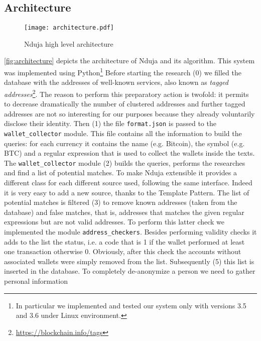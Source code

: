 \subsection{Architecture}


\begin{figure*}
	\centering
	\texttt{[image: architecture.pdf]}
	\caption{Nduja high level architecture}
	\label{fig:architecture}
\end{figure*}



\autoref{fig:architecture} depicts the architecture of Nduja and its algorithm.
This system was implemented using Python\footnote{
	In particular we implemented and tested our system only with versions
	3.5 and 3.6 under Linux environment.}
Before starting the research (0) we filled the database with the addresses of
well-known services, also known as
\emph{tagged addresses}\footnote{\url{https://blockchain.info/tags}}.
The reason to perform this preparatory action 
is twofold: it permits to decrease dramatically the number of
clustered addresses and further tagged addresses are not so
interesting for our purposes because they already voluntarily disclose their
identity.
Then (1) the file \texttt{format.json} is passed to the \verb|wallet_collector|
module. This file contains all the information to build the queries: for each
currency it contains the name (e.g. Bitcoin), the symbol (e.g. BTC) and a
regular expression that is used to collect the wallets inside the texts.
The \verb|wallet_collector| module (2) builds the queries, performs the
researches and find a list of potential matches. To make Nduja extensible it
provides a different class for each different source used, following the same
interface. Indeed it is very easy to add a new source, thanks to the Template
Pattern.
The list of potential matches is filtered (3) to remove known addresses (taken
from the database) and false matches, that is, addresses that matches the given
regular expressions but are not valid addresses. To perform this latter check
we implemented the module \verb|address_checkers|.
Besides performing validity checks it adds to the list the status, i.e. a
code that is 1 if the wallet performed at least one transaction otherwise 0.
Obviously, after this check the accounts without associated wallets were simply
removed from the list.
Subsequently (5) this list is inserted in the database.
To completely de-anonymize a person we need to gather personal information
